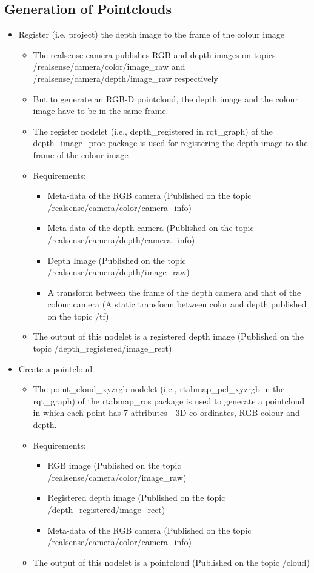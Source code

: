 \documentclass[a4paper,12pt,oneside]{book}
\begin{document}
\subsection*{Generation of Pointclouds}
\begin{itemize}

	\item Register (i.e. project) the depth image to the frame of the colour image
		\begin{itemize}
			\item The realsense camera publishes RGB and depth images on topics /realsense/camera/color/image\_raw and /realsense/camera/depth/image\_raw respectively
			\item But to generate an RGB-D pointcloud, the depth image and the colour image have to be in the same frame.
			\item The register nodelet (i.e., depth\_registered in rqt\_graph) of the depth\_image\_proc package is used for registering the depth image to the frame of the colour image
			\item Requirements:
				\begin{itemize}
					\item Meta-data of the RGB camera (Published on the topic /realsense/camera/color/camera\_info)
					\item Meta-data of the depth camera (Published on the topic /realsense/camera/depth/camera\_info)
					\item Depth Image (Published on the topic /realsense/camera/depth/image\_raw)
					\item A transform between the frame of the depth camera and that of the colour camera (A static transform between color and depth published on the topic /tf)
				\end{itemize}
			\item The output of this nodelet is a registered depth image (Published on the topic /depth\_registered/image\_rect)
		\end{itemize}
	
	\item Create a pointcloud
		\begin{itemize}
			\item The point\_cloud\_xyzrgb nodelet (i.e., rtabmap\_pcl\_xyzrgb in the rqt\_graph) of the rtabmap\_ros package is used to generate a pointcloud in which each point has 7 attributes - 3D co-ordinates, RGB-colour and depth.
			\item Requirements:
				\begin{itemize}
					\item RGB image (Published on the topic /realsense/camera/color/image\_raw)
					\item Registered depth image (Published on the topic /depth\_registered/image\_rect)
					\item Meta-data of the RGB camera (Published on the topic /realsense/camera/color/camera\_info)
				\end{itemize}
			\item The output of this nodelet is a pointcloud (Published on the topic /cloud)
		\end{itemize}
		
\end{itemize}
\end{document}
